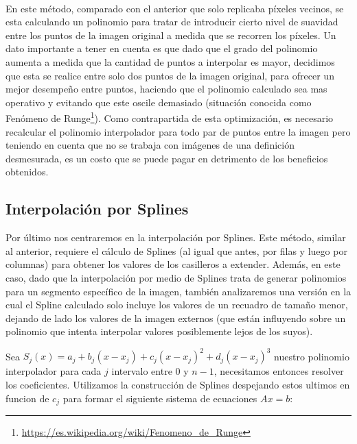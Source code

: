 \\
En este método, comparado con el anterior que solo replicaba píxeles vecinos, se esta calculando un polinomio para tratar de introducir cierto nivel de suavidad entre los puntos de la imagen original a medida que se recorren los píxeles. Un dato importante a tener en cuenta es que dado que el grado del polinomio aumenta a medida que la cantidad de puntos a interpolar es mayor, decidimos que esta se realice entre solo dos puntos de la imagen original, para ofrecer un mejor desempe\~no entre puntos, haciendo que el polinomio calculado sea mas operativo y evitando que este oscile demasiado (situación conocida como Fenómeno de Runge\footnote{\url{https://es.wikipedia.org/wiki/Fenomeno_de_Runge}}). Como contrapartida de esta optimización, es necesario recalcular el polinomio interpolador para todo par de puntos entre la imagen pero teniendo en cuenta que no se trabaja con imágenes de una definición desmesurada, es un costo que se puede pagar en detrimento de los beneficios obtenidos.


\subsection{Interpolación por Splines}
Por último nos centraremos en la interpolación por Splines. Este método, similar al anterior, requiere el cálculo de Splines (al igual que antes, por filas y luego por columnas) para obtener los valores de los casilleros a extender.
Además, en este caso, dado que la interpolación por medio de Splines trata de generar polinomios para un segmento
específico de la imagen, también analizaremos una versión en la cual el Spline calculado solo incluye los valores de un recuadro de tamaño menor, dejando de lado los valores de la imagen externos (que están influyendo sobre un polinomio que intenta interpolar valores posiblemente lejos de los suyos).

Sea $S_{j}(x) = a_{j} + b_{j}(x - x_{j}) + c_{j}(x - x_{j})^2 + d_{j}(x - x_{j})^3$ nuestro polinomio interpolador para cada $j$ intervalo entre $0$ y $n-1$, necesitamos entonces resolver los coeficientes. Utilizamos la construcción de Splines despejando estos ultimos en funcion de $c_{j}$ para formar el siguiente sistema de ecuaciones $Ax = b$:

